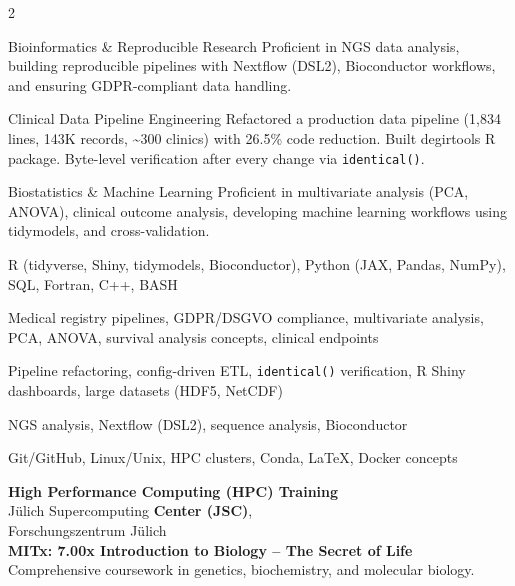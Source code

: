 \documentclass{thejus_cv}
\begin{document}
\begin{paracol}{2}
\switchcolumn



\cvstrength{\faAward}
           {Bioinformatics \& Reproducible Research}
           {Proficient in NGS data analysis, building reproducible pipelines with Nextflow (DSL2), Bioconductor workflows, and ensuring GDPR-compliant data handling.}

\cvstrength{\faStar}
           {Clinical Data Pipeline Engineering}
           {Refactored a production data pipeline (1,834 lines, 143K records, \textasciitilde300 clinics) with 26.5\% code reduction. Built degirtools R package. Byte-level verification after every change via \texttt{identical()}.}

\cvstrength{\faLightbulb}
           {Biostatistics \& Machine Learning}
           {Proficient in multivariate analysis (PCA, ANOVA), clinical outcome analysis, developing machine learning workflows using tidymodels, and cross-validation.}


         {R (tidyverse, Shiny, tidymodels, Bioconductor), Python (JAX, Pandas, NumPy), SQL, Fortran, C++, BASH}

         {Medical registry pipelines, GDPR/DSGVO compliance, multivariate analysis, PCA, ANOVA, survival analysis concepts, clinical endpoints}

         {Pipeline refactoring, config-driven ETL, \texttt{identical()} verification, R Shiny dashboards, large datasets (HDF5, NetCDF)}

         {NGS analysis, Nextflow (DSL2), sequence analysis, Bioconductor}

         {Git/GitHub, Linux/Unix, HPC clusters, Conda, LaTeX, Docker concepts}


\textbf{High Performance Computing (HPC) Training}\\
J\"ulich Supercomputing \textbf{Center (JSC)},\\
Forschungszentrum J\"ulich\\[0.3cm]

\textbf{MITx: 7.00x Introduction to Biology -- The Secret of Life}\\
{\small Comprehensive coursework in genetics, biochemistry, and molecular biology.}\\[0.4cm]


\end{paracol}
\end{document}
